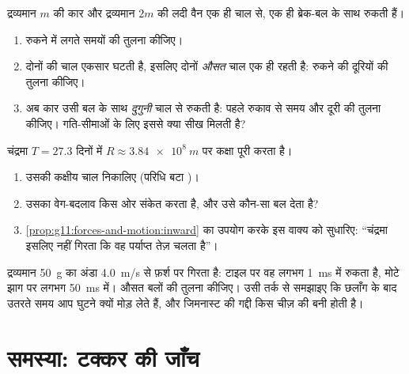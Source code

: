 \begin{exercise}[$\star\star\star$]\label{exo:g11:forces-and-motion:13}
द्रव्यमान $m$ की कार और द्रव्यमान $2m$ की लदी वैन एक ही चाल से, एक ही
ब्रेक-बल के साथ रुकती हैं।
\begin{enumerate}
  \item रुकने में लगते समयों की तुलना कीजिए।
  \item दोनों की चाल एकसार घटती है, इसलिए दोनों \emph{औसत} चाल एक ही रहती
        है: रुकने की दूरियों की तुलना कीजिए।
  \item अब कार उसी बल के साथ \emph{दुगुनी} चाल से रुकती है: पहले
        रुकाव से समय और दूरी की तुलना कीजिए। गति-सीमाओं के लिए इससे क्या सीख
        मिलती है?
\end{enumerate}
\end{exercise}

\begin{exercise}[$\star\star\star$]\label{exo:g11:forces-and-motion:14}
चंद्रमा $T = \num{27.3}$ दिनों में $R \approx \qty{3.84e8}{m}$ पर कक्षा पूरी करता है।
\begin{enumerate}
  \item उसकी कक्षीय चाल निकालिए (परिधि बटा )।
  \item उसका वेग-बदलाव किस ओर संकेत करता है, और उसे कौन-सा बल देता
        है?
  \item \cref{prop:g11:forces-and-motion:inward} का उपयोग करके इस वाक्य को सुधारिए: ``चंद्रमा इसलिए नहीं
        गिरता कि वह पर्याप्त तेज़ चलता है''।
\end{enumerate}
\end{exercise}

\begin{exercise}[$\star\star\star$]\label{exo:g11:forces-and-motion:15}
द्रव्यमान \qty{50}{g} का अंडा \qty{4.0}{m/s} से फ़र्श पर गिरता है: टाइल पर वह लगभग
\qty{1}{ms} में रुकता है, मोटे झाग पर लगभग \qty{50}{ms} में। औसत बलों की
तुलना कीजिए। उसी तर्क से समझाइए कि छलाँग के बाद उतरते समय आप घुटने क्यों मोड़
लेते हैं, और जिमनास्ट की गद्दी किस चीज़ की बनी होती है।
\end{exercise}

\section{समस्या: टक्कर की जाँच}

